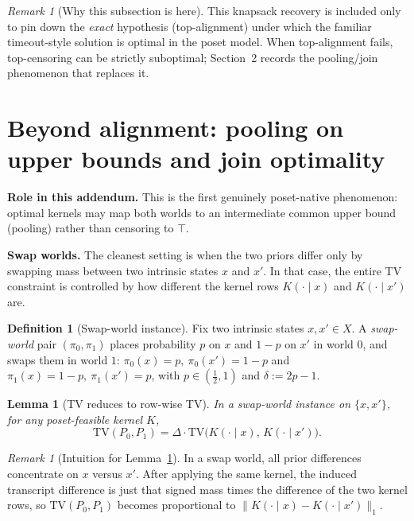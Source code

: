 \documentclass[11pt]{article}
\newtheorem{lemma}[theorem]{Lemma}
\theoremstyle{definition}
\newtheorem{definition}[theorem]{Definition}
\theoremstyle{remark}
\newtheorem{remark}[theorem]{Remark}
\newcommand{\TV}{\mathrm{TV}}
\begin{document}
\begin{remark}[Why this subsection is here]
This knapsack recovery is included only to pin down the \emph{exact} hypothesis (top-alignment) under which the familiar timeout-style solution is optimal in the poset model.
When top-alignment fails, top-censoring can be strictly suboptimal; Section~2 records the pooling/join phenomenon that replaces it.
\end{remark}


\section{Beyond alignment: pooling on upper bounds and join optimality}
\noindent\textbf{Role in this addendum.} This is the first genuinely poset-native phenomenon: optimal kernels may map both worlds to an intermediate common upper bound (pooling) rather than censoring to $\top$.

\vspace{0.25em}\noindent
\textbf{Swap worlds.} The cleanest setting is when the two priors differ only by swapping mass between two intrinsic states $x$ and $x'$.
In that case, the entire TV constraint is controlled by how different the kernel rows $K(\cdot\mid x)$ and $K(\cdot\mid x')$ are.

\begin{definition}[Swap-world instance]\label{def:swapworld}
Fix two intrinsic states $x,x'\in X$.
A \emph{swap-world} pair $(\pi_0,\pi_1)$ places probability $p$ on $x$ and $1-p$ on $x'$ in world $0$, and swaps them in world $1$:
$\pi_0(x)=p,\ \pi_0(x')=1-p$ and $\pi_1(x)=1-p,\ \pi_1(x')=p$, with $p\in(\tfrac12,1)$ and $\delta:=2p-1$.
\end{definition}

\begin{lemma}[TV reduces to row-wise TV]\label{lem:tvrows}
In a swap-world instance on $\{x,x'\}$, for any poset-feasible kernel $K$,
\[
\TV(P_0,P_1)=\Delta\cdot \TV\big(K(\cdot\mid x),\,K(\cdot\mid x')\big).
\]
\end{lemma}

\begin{remark}[Intuition for Lemma~\ref{lem:tvrows}]
In a swap world, all prior differences concentrate on $x$ versus $x'$.
After applying the same kernel, the induced transcript difference is just that signed mass times the difference of the two kernel rows, so $\TV(P_0,P_1)$ becomes proportional to $\|K(\cdot\mid x)-K(\cdot\mid x')\|_1$.
\end{remark}
\end{document}
